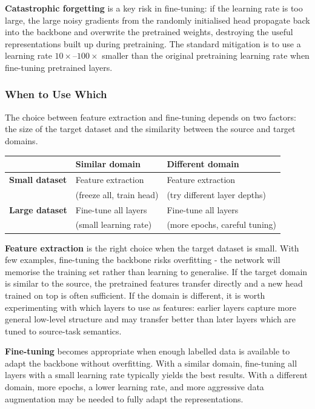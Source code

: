 \textbf{Catastrophic forgetting} is a key risk in fine-tuning: if the learning rate is too large, the large noisy gradients from the randomly initialised head propagate back into the backbone and overwrite the pretrained weights, destroying the useful representations built up during pretraining. The standard mitigation is to use a learning rate $10\times$--$100\times$ smaller than the original pretraining learning rate when fine-tuning pretrained layers.
\subsubsection{When to Use Which}

The choice between feature extraction and fine-tuning depends on two factors: the size of the target dataset and the similarity between the source and target domains.
\begin{center}
\begin{tabular}{lll}
\toprule
 & \textbf{Similar domain} & \textbf{Different domain} \\
\midrule
\textbf{Small dataset} &
    Feature extraction &
    Feature extraction \\
 & (freeze all, train head) & (try different layer depths) \\[0.8em]
\textbf{Large dataset} &
    Fine-tune all layers &
    Fine-tune all layers \\
 & (small learning rate) & (more epochs, careful tuning) \\
\bottomrule
\end{tabular}
\end{center}

\textbf{Feature extraction} is the right choice when the target dataset is small. With few examples, fine-tuning the backbone risks overfitting - the network will memorise the training set rather than learning to generalise. If the target domain is similar to the source, the pretrained features transfer directly and a new head trained on top is often sufficient. If the domain is different, it is worth experimenting with which layers to use as features: earlier layers capture more general low-level structure and may transfer better than later layers which are tuned to source-task semantics.

\textbf{Fine-tuning} becomes appropriate when enough labelled data is available to adapt the backbone without overfitting. With a similar domain, fine-tuning all layers with a small learning rate typically yields the best results. With a different domain, more epochs, a lower learning rate, and more aggressive data augmentation may be needed to fully adapt the representations.

